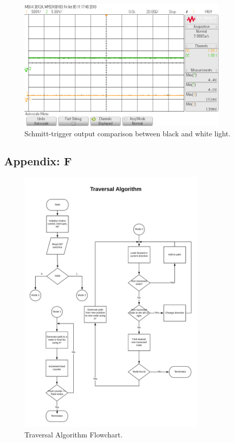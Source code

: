 \begin{figure}[H]
\centering
\includegraphics[width=0.9\textwidth]{figures/Osc-out.png}
\caption{Schmitt-trigger output comparison between black and white light.}
\end{figure}

\subsection*{Appendix: F}

\begin{figure}[H]
\centering
\includegraphics[width=0.8\textwidth]{figures/traverse_flowchart.png}
\caption{Traversal Algorithm Flowchart.}
\end{figure}

